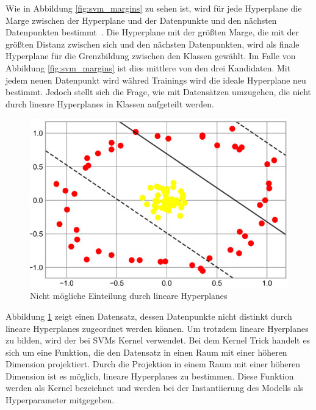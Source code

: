 Wie in Abbildung \ref{fig:svm_margins} zu sehen ist, wird für jede Hyperplane die Marge zwischen der Hyperplane und der Datenpunkte und den nächsten Datenpunkten bestimmt~\cite[S. 438]{10.5555/3133359}.
Die Hyperplane mit der größten Marge, die mit der größten Distanz zwischen sich und den nächsten Datenpunkten, wird als finale Hyperplane für die Grenzbildung zwischen den Klassen gewählt. Im Falle von Abbildung \ref{fig:svm_margins}
ist dies mittlere von den drei Kandidaten. Mit jedem neuen Datenpunkt wird währed Trainings wird die ideale Hyperplane neu bestimmt.
Jedoch stellt sich die Frage, wie mit Datensätzen umzugehen, die nicht durch lineare Hyperplanes in Klassen aufgeteilt werden.

\pagebreak

\begin{figure}[h]
    \centering
    \includegraphics[scale=0.5]{figures/svm_non_linear.png}
    \caption{Nicht mögliche Einteilung durch lineare Hyperplanes}
    \label{fig:svm_non_linear}
\end{figure}


Abbildung \ref{fig:svm_non_linear} zeigt einen Datensatz, dessen Datenpunkte nicht distinkt durch lineare Hyperplanes zugeordnet werden können\cite[S. 441]{10.5555/3133359}. Um trotzdem lineare Hyerplanes zu bilden,
wird der bei SVMs Kernel verwendet. Bei dem Kernel Trick handelt es sich um eine Funktion, die den Datensatz in einen Raum mit einer höheren Dimension projektiert.
Durch die Projektion in einem Raum mit einer höheren Dimension ist es möglich, lineare Hyperplanes zu bestimmen.
Diese Funktion werden als Kernel bezeichnet und werden bei der Instantiierung des Modells als Hyperparameter mitgegeben.

